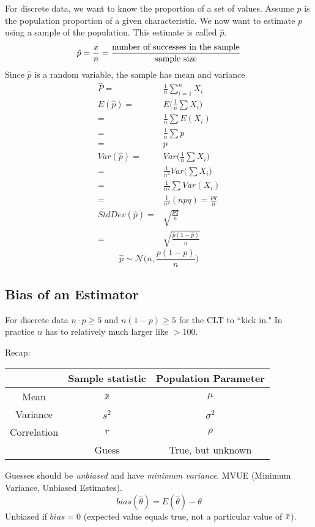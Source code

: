 \documentclass[11pt, oneside]{article}   	%
\newcommand{\overbar}[1]{\mkern 1.5mu\overline{\mkern-1.5mu#1\mkern-1.5mu}\mkern 1.5mu}
\begin{document}
For discrete data, we want to know the proportion of a set of values. Assume $p$ is the population proportion of a given characteristic. We now want to estimate $p$ using a sample of the population. This estimate is called $\hat{p}$.
\[
\hat{p} = \frac{x}{n} = \frac{\text{number of successes in the sample}}{\text{sample size}}\\
\]
Since $\hat{p}$ is a random variable, the sample has mean and variance
\begin{align*}
\hat{P} =& \frac{1}{n}\sum \limits_{i=1}^{n} X_i\\
E(\hat{p}) =& E\bigg(\frac{1}{n}\sum X_i \bigg) \\
 =& \frac{1}{n}\sum E(X_i)\\
 =& \frac{1}{n}\sum p\\
 =&p \\
 Var(\hat{p}) =& Var\bigg(\frac{1}{n}\sum X_i \bigg)\\
   =& \frac{1}{n^2} Var\bigg( \sum X_i \bigg) \\
   =& \frac{1}{n^2}\sum Var(X_i) \\
   =& \frac{1}{n^2} (npq) = \frac{pq}{n}\\
 StdDev(\hat{p}) =& \sqrt{\frac{pq}{n}} \\
  =& \sqrt{\frac{\hat{p}(1-\hat{p})}{n}}  
\end{align*}
\[
\hat{p} \sim \mathcal{N} \bigg(n, \frac{p(1-p)}{n}\bigg)
\]

\subsection{Bias of an Estimator}

For discrete data $n\cdot p \geq 5$ and $n(1-p) \geq 5$ for the CLT to ``kick in." In practice $n$ has to relatively much larger like $> 100$.

Recap:
\begin{tabular}{| c | c | c| }
\hline
 & Sample statistic &  Population Parameter \\
 \hline
 Mean & $\overbar{x}$ & $\mu$ \\
 Variance & $s^2$ & $\sigma^2$ \\
 Correlation & $r$ & $\rho$ \\
\hline
& Guess & True, but unknown \\
\hline
\end{tabular}

Guesses should be \textit{unbiased} and have \textit{minimum variance}. MVUE (Minimum Variance, Unbiased Estimates).
\[
bias(\hat{\theta}) = E(\hat{\theta}) - \theta
\]
Unbiased if $bias = 0$ (expected value equals true, not a particular value of $\overbar{x}$). 
\end{document}
